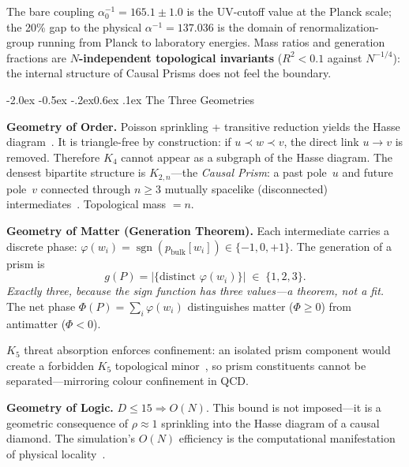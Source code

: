 \documentclass[aps,prl,twocolumn,superscriptaddress,nofootinbib,amsmath,amssymb,floatfix]{revtex4-2}
\makeatletter
\def\sec@upcase#1{\uppercase{#1}}
\renewcommand\section{\@startsection{section}{1}{\z@}%
  {-2.0ex \@plus -0.5ex \@minus -.2ex}{0.6ex \@plus .1ex}%
  {\normalfont\small\bfseries\centering\sec@upcase}}
\makeatother
\begin{document}
The bare coupling $\alpha^{-1}_0 = 165.1 \pm 1.0$ is the UV-cutoff value
at the Planck scale; the 20\% gap to the physical $\alpha^{-1} = 137.036$
is the domain of renormalization-group running from Planck to laboratory
energies.  Mass ratios and generation fractions are \textbf{$N$-independent
topological invariants} ($R^2 < 0.1$ against $N^{-1/4}$): the internal
structure of Causal Prisms does not feel the boundary.

\section{The Three Geometries}\label{sec:geometries}

\textbf{Geometry of Order.}
Poisson sprinkling + transitive reduction yields the Hasse
diagram~\cite{bombelli1987,surya2019}.
It is triangle-free by construction: if $u \prec w \prec v$, the direct
link $u \to v$ is removed.  Therefore $K_4$ cannot appear as a subgraph
of the Hasse diagram.
The densest bipartite structure is
$K_{2,n}$---the \emph{Causal Prism}: a past pole~$u$ and future pole~$v$
connected through $n \geq 3$ mutually spacelike (disconnected)
intermediates~\cite{kuratowski1930,diestel2017}.
Topological mass $= n$.

\textbf{Geometry of Matter (Generation Theorem).}
Each intermediate carries a discrete phase:
$\varphi(w_i) = \operatorname{sgn}(p_{\text{bulk}}[w_i])
\in \{-1, 0, +1\}$.
The generation of a prism is
\begin{equation}
  g(P) = |\{\text{distinct } \varphi(w_i)\}| \;\in\; \{1, 2, 3\}.
\end{equation}
\emph{Exactly three, because the sign function has three values---a
theorem, not a fit.}
The net phase
$\Phi(P) = \sum_i \varphi(w_i)$
distinguishes matter ($\Phi \geq 0$) from antimatter ($\Phi < 0$).

$K_5$ threat absorption enforces confinement: an isolated prism component
would create a forbidden $K_5$ topological minor~\cite{kuratowski1930},
so prism constituents cannot be separated---mirroring colour confinement
in QCD.

\textbf{Geometry of Logic.}
$D \leq 15 \Rightarrow O(N)$.  This bound is not imposed---it is
a geometric consequence of $\rho \approx 1$ sprinkling into the Hasse
diagram of a causal diamond.  The simulation's $O(N)$ efficiency is
the computational manifestation of physical
locality~\cite{stone1936,bombelli2009}.
\end{document}
